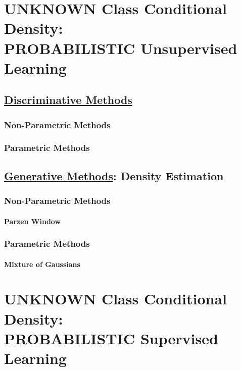 \documentclass{book}
\begin{document}
\part{UNKNOWN Class Conditional Density:\\PROBABILISTIC Unsupervised Learning}

\chapter{\underline{Discriminative Methods}}
\section{Non-Parametric Methods}

\section{Parametric Methods}
\chapter{\underline{Generative Methods}: Density Estimation}
\section{Non-Parametric Methods}

\subsection{Parzen Window}

\section{Parametric Methods}

\subsection{Mixture of Gaussians}

\part{UNKNOWN Class Conditional Density:
\\PROBABILISTIC Supervised Learning}
\end{document}
